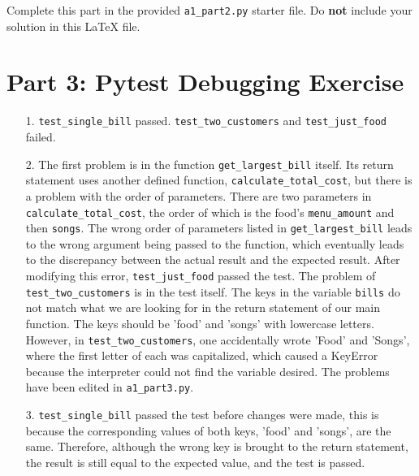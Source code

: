 Complete this part in the provided \texttt{a1\_part2.py} starter file.
Do \textbf{not} include your solution in this LaTeX file.

\section*{Part 3: Pytest Debugging Exercise}


\begin{enumerate}
\item[1.]
\texttt{test\_single\_bill} passed.  \texttt{test\_two\_customers} and \texttt{test\_just\_food} failed.


\item[2.]
The first problem is in the function \texttt{get\_largest\_bill} itself. Its return statement uses another defined function, \texttt{calculate\_total\_cost}, but there is a problem with the order of parameters. There are two parameters in \texttt{calculate\_total\_cost}, the order of which is the food's \texttt{menu\_amount} and then \texttt{songs}. The wrong order of parameters listed in \texttt{get\_largest\_bill} leads to the wrong argument being passed to the function, which eventually leads to the discrepancy between the actual result and the expected result.  After modifying this error, \texttt{test\_just\_food} passed the test. The problem of \texttt{test\_two\_customers} is in the test itself. The keys in the variable \texttt{bills} do not match what we are looking for in the return statement of our main function. The keys should be 'food' and 'songs' with lowercase letters. However, in \texttt{test\_two\_customers}, one accidentally wrote 'Food' and 'Songs', where the first letter of each was capitalized, which caused a KeyError because the interpreter could not find the variable desired. The problems have been edited in \texttt{a1\_part3.py}.

\item[3.]
\texttt{test\_single\_bill} passed the test before changes were made, this is because the corresponding values of both keys, 'food' and 'songs', are the same. Therefore, although the wrong key is brought to the return statement, the result is still equal to the expected value, and the test is passed.
\end{enumerate}

